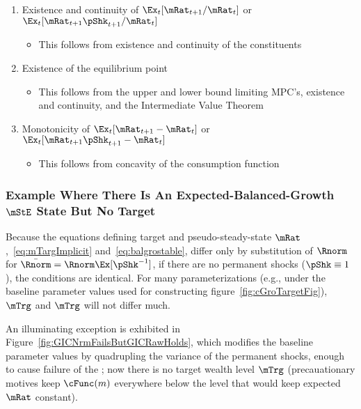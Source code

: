 \documentclass[ProjectDLO]{subfiles}
\begin{document}
\begin{enumerate}
\item Existence and continuity of $\Ex_{t}[\mRat_{t+1}/\mRat_{t}]$ or $\Ex_{t}[\mRat_{t+1}\pShk_{t+1}/\mRat_{t}]$
  \begin{itemize}
    \item This follows from existence and continuity of the constituents
    \end{itemize}
  \item Existence of the equilibrium point
    \begin{itemize}
    \item This follows from the upper and lower bound limiting MPC's, existence and continuity, and the Intermediate Value Theorem
    \end{itemize}
  \item Monotonicity of $\Ex_{t}[{\mRat}_{t+1}-\mRat_{t}]$ or $\Ex_{t}[{\mRat}_{t+1}\pShk_{t+1}-\mRat_{t}]$
    \begin{itemize}
    \item This follows from concavity of the consumption function
    \end{itemize}
\end{enumerate}

\subsubsection{Example Where There Is An Expected-Balanced-Growth
  \texorpdfstring{$\mStE$}{m} State But No Target}

Because the equations defining target and pseudo-steady-state $\mRat$,~\eqref{eq:mTargImplicit} and~\eqref{eq:balgrostable}, differ only by substitution of $\Rnorm$ for $\bar{\Rnorm}=\Rnorm \Ex[\pShk^{-1}]$, if there are no permanent shocks ($\pShk \equiv 1$), the conditions are identical.  For many parameterizations (e.g., under the baseline parameter values used for constructing figure~\ref{fig:cGroTargetFig}), $\mTrg$ and $\mTrg$ will not differ much.

An illuminating exception is exhibited in Figure~\ref{fig:GICNrmFailsButGICRawHolds}, which modifies the baseline parameter values by quadrupling the variance of the permanent shocks, enough to cause failure of the \GICNrm; now there is no target wealth level $\mTrg$ (precauationary motives keep $\cFunc(m)$ everywhere below the level that would keep expected $\mRat$ constant).


\renewcommand{\figFile}{GICNrmFailsButGICRawHolds}
\hypertarget{\figFile}{}

\end{document}
